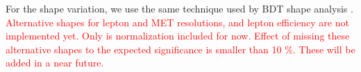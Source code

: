 For the shape variation, we use the same technique used by BDT shape analysis \cite{MVASyst}.
\textcolor{red}{Alternative shapes for lepton \pt and MET resolutions, and lepton efficiency 
are not implemented yet. Only is normalization included for now. Effect of missing these 
alternative shapes to the expected significance is smaller than 10 \%. These will be added 
in a near future.}
